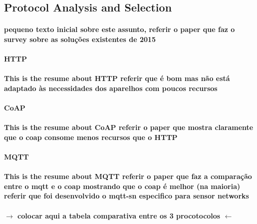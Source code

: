\subsection{Protocol Analysis and Selection}

\paragraph{
	pequeno texto inicial sobre este assunto, referir o paper que faz o survey sobre as soluções existentes de 2015 \cite{Al-Fuqaha2015}
}

\paragraph{\textbf{\ac{HTTP}}}
\paragraph{
	This is the resume about HTTP
	referir que é bom mas não está adaptado às necessidades dos aparelhos com poucos recursos
}

\paragraph{\textbf{\ac{CoAP}}}
\paragraph{
	This is the resume about CoAP
	referir o paper que mostra claramente que o coap consome menos recursos que o HTTP \cite{Savolainen2014}
}

\paragraph{\textbf{\ac{MQTT}}}
\paragraph{
	This is the resume about MQTT
	referir o paper que faz a comparação entre o mqtt e o coap mostrando que o coap é melhor (na maioria) \cite{Ma2014}
	referir que foi desenvolvido o mqtt-sn \cite{Ibm2013} especifico para sensor networks
}

\paragraph{
	$\rightarrow$ colocar aqui a tabela comparativa entre os 3 procotocolos $\leftarrow$
}

